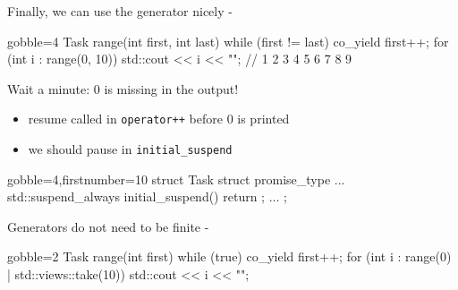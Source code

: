 \begin{frame}[fragile]
  \begin{exampleblock}{Finally, we can use the generator nicely - }
    {\scriptsize
      \begin{cppcode*}{gobble=4}
        Task range(int first, int last) {
          while (first != last) {
            co_yield first++;
          }
        }
        for (int i : range(0, 10)) {
          std::cout << i << "";
        } // 1 2 3 4 5 6 7 8 9
      \end{cppcode*}
    }
  \end{exampleblock}
  \pause
  \begin{alertblock}{Wait a minute: 0 is missing in the output!}
    \begin{itemize}
    \item resume called in \texttt{operator++} before 0 is printed
    \item we should pause in \texttt{initial_suspend}
    \end{itemize}
     {\scriptsize
      \begin{cppcode*}{gobble=4,firstnumber=10}
        struct Task {
          struct promise_type {
            ...
            std::suspend_always initial_suspend() { return {}; }
            ...
          }
        };
      \end{cppcode*}
    }
  \end{alertblock}
\end{frame}

\begin{frame}[fragile]
  \begin{block}{Generators do not need to be finite - }
    \begin{cppcode*}{gobble=2}
      Task range(int first) {
        while (true) {
          co_yield first++;
        }
      }
      for (int i : range(0) | std::views::take(10)) {
        std::cout << i << "\n";
      }
    \end{cppcode*}
  \end{block}
\end{frame}

